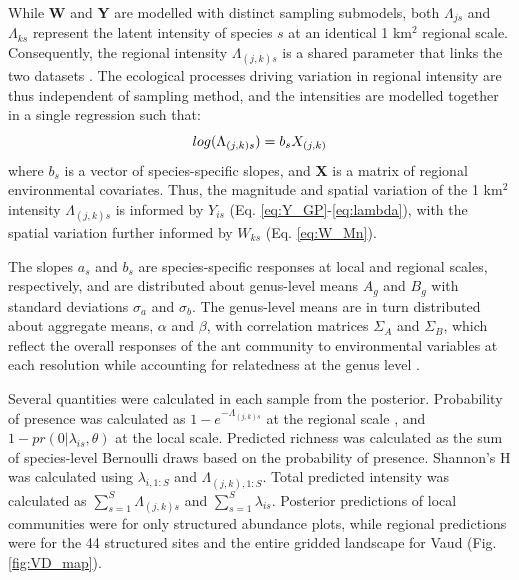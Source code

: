\documentclass[preprint,final,times,12pt,3p]{elsarticle}
\begin{document}
While \textbf{W} and \textbf{Y} are modelled with distinct sampling submodels, both $\Lambda_{js}$ and $\Lambda_{ks}$ represent the latent intensity of species $s$ at an identical 1 km$^2$ regional scale. Consequently, the regional intensity $\Lambda_{(j,k)s}$ is a shared parameter that links the two datasets \citep{Hefley2016,Isaac2019,Miller2019}. The ecological processes driving variation in regional intensity are thus independent of sampling method, and the intensities are modelled together in a single regression such that:
    \begin{equation}
        log(\Lambda_{(j,k)s}) = b_s X_{(j,k)} \\
        \label{eq:LAMBDA}
    \end{equation}
where $b_s$ is a vector of species-specific slopes, and \textbf{X} is a matrix of regional environmental covariates. Thus, the magnitude and spatial variation of the 1 km$^2$ intensity $\Lambda_{(j,k)s}$ is informed by $Y_{is}$ (Eq. \ref{eq:Y_GP}-\ref{eq:lambda}), with the spatial variation further informed by $W_{ks}$ (Eq. \ref{eq:W_Mn}).

The slopes $a_s$ and $b_s$ are species-specific responses at local and regional scales, respectively, and are distributed about genus-level means $A_g$ and $B_g$ with standard deviations $\sigma_a$ and $\sigma_b$. The genus-level means are in turn distributed about aggregate means, $\alpha$ and $\beta$, with correlation matrices $\Sigma_A$ and $\Sigma_B$, which reflect the overall responses of the ant community to environmental variables at each resolution while accounting for relatedness at the genus level \citep{Hadfield2010b,Ovaskainen2011,Szewczyk2018,Caradima2019}.

Several quantities were calculated in each sample from the posterior. Probability of presence was calculated as $1 - e^{-\Lambda_{(j,k)s}}$ at the regional scale \citep{Hefley2016}, and $1 - pr(0 | \lambda_{is}, \theta)$ at the local scale. Predicted richness was calculated as the sum of species-level Bernoulli draws based on the probability of presence. Shannon's H was calculated using $\lambda_{i,1:S}$ and $\Lambda_{(j,k),1:S}$. Total predicted intensity was calculated as $\sum_{s=1}^{S}\Lambda_{(j,k)s}$ and $\sum_{s=1}^{S}\lambda_{is}$. Posterior predictions of local communities were for only structured abundance plots, while regional predictions were for the 44 structured sites and the entire gridded landscape for Vaud (Fig. \ref{fig:VD_map}). 
\end{document}
